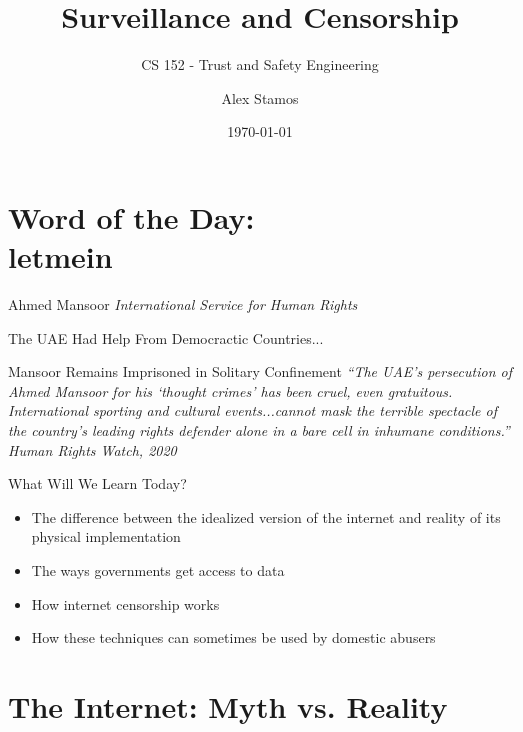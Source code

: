 \documentclass[nobackground,dvipsnames,table]{beamer}
\title{Surveillance and Censorship}
\subtitle{CS 152 - Trust and Safety Engineering}
\author[A. Stamos]{Alex Stamos}
\institute[Stanford University]{Stanford Cyber Policy Center}
\date[2022]{\today}
\begin{document}
\coverpage

\begin{frame}
    \titlepage
\end{frame}
\section{Word of the Day:\\letmein}

\begin{frame}{Ahmed Mansoor}
    \textit{International Service for Human Rights}
\end{frame}

\begin{frame}{The UAE Had Help From Democractic Countries...}
\end{frame}

\begin{frame}{Mansoor Remains Imprisoned in Solitary Confinement}
    \centering
    \textit{“The UAE’s persecution of Ahmed Mansoor for his ‘thought crimes’ has been cruel, even gratuitous. International sporting and cultural events...cannot mask the terrible spectacle of the country’s leading rights defender alone in a bare cell in inhumane conditions.”}\\
    
    \small{\textit{Human Rights Watch, 2020}}
\end{frame}

\begin{frame}{What Will We Learn Today?}
    \begin{itemize}
        \item The difference between the idealized version of the internet and reality of its physical implementation
        \item The ways governments get access to data
        \item How internet censorship works
        \item How these techniques can sometimes be used by domestic abusers
    \end{itemize}
\end{frame}

\section{The Internet: Myth vs. Reality}
\end{document}
